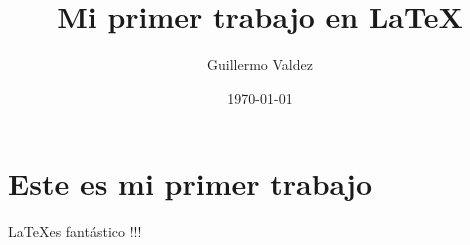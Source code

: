\documentclass[letterpaper,titlepage]{article}
\title{Mi primer trabajo en \LaTeX}
\author{Guillermo Valdez}
\date{\today}
\begin{document}
\maketitle

\section{Este es mi primer trabajo}

\LaTeX es fantástico !!!
\end{document}
